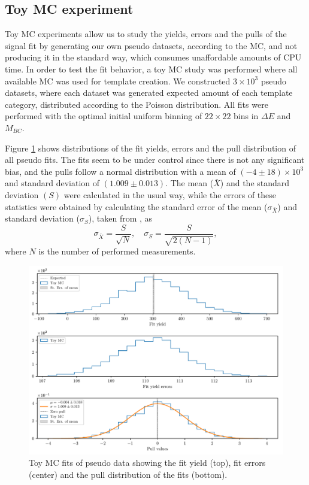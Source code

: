 \documentclass[headings=standardclasses,headings=big,oneside,a4paper,openany,12pt]{scrbook}
\newcommand {\E}[1]{\times 10^{#1}}
\newcommand {\vars}{$\Delta E$ and $M_{BC}$}
\begin{document}
\subsection{Toy MC experiment}

Toy MC experiments allow us to study the yields, errors and the pulls of the signal fit by generating our own pseudo datasets, according to the MC, and not producing it in the standard way, which consumes unaffordable amounts of CPU time. In order to test the fit behavior, a toy MC study was performed where all available MC was used for template creation. We constructed $3\E{3}$ pseudo datasets, where each dataset was generated expected amount of each template category, distributed according to the Poisson distribution. All fits were performed with the optimal initial uniform binning of $22\times22$ bins in \vars.

Figure \ref{fig:toyMC} shows distributions of the fit yields, errors and the pull distribution of all pseudo fits. The fits seem to be under control since there is not any significant bias, and the pulls follow a normal distribution with a mean of $(-4\pm18)\E{3}$ and standard deviation of $(1.009\pm0.013)$. The mean ($\bar X$) and the standard deviation $(S)$ were calculated in the usual way, while the errors of these statistics were obtained by calculating the standard error of the mean ($\sigma_{\bar X}$) and standard deviation ($\sigma_S$), taken from \cite{ahn2003standard}, as
\begin{equation}
\sigma_{\bar X} = \frac{S}{\sqrt{N}},\quad \sigma_{S} = \frac{S}{\sqrt{2(N-1)}},
\end{equation}
where $N$ is the number of performed measurements.

\begin{figure}[H]
	\centering
	\captionsetup{width=0.8\linewidth}
	\includegraphics[width=\linewidth]{fig/toyMC}
	\caption{Toy MC fits of pseudo data showing the fit yield (top), fit errors (center) and the pull distribution of the fits (bottom).}
	\label{fig:toyMC}
\end{figure}
\end{document}
